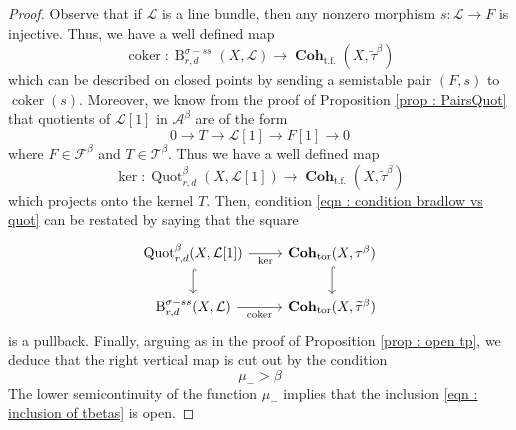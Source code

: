 \documentclass[10pt,a4paper]{amsart}
\newcommand{\Quotbetaonerd}{\operatorname{Quot}_{r,d}^{\beta}(X,\mathcal{L}[1])}
\newcommand{\abeta}{\mathcal{A}^{\beta}}
\newcommand{\bradlb}{\operatorname{{B}}^{\sigma - ss}_{r,d}(X,\mathcal{L})}
\newcommand{\cohflat}{\boldsymbol{\operatorname{Coh}}}
\newcommand{\fbeta}{\mathcal{F}^{\beta}}
\newcommand{\linebundle}{\mathcal{L}}
\newcommand{\tbeta}{\mathcal{T}^{\beta}}
\begin{document}
\begin{proof}
    \noindent Observe that if $\linebundle$ is a line bundle, then any nonzero morphism $s \colon \linebundle \rightarrow F$ is injective. Thus, we have a well defined map
    \begin{equation}\label{eqn : coker map for bradlow pairs}
        \operatorname{coker} \colon \bradlb \longrightarrow \cohflat_{\operatorname{t.f.}}(X,\widetilde{\tau}^{\beta})
    \end{equation}
     which can be described on closed points by sending a semistable pair $(F,s)$ to $\operatorname{coker}(s)$. Moreover, we know from the proof of Proposition \eqref{prop : PairsQuot} that quotients of $\linebundle[1]$ in $\abeta$ are of the form
    \[
        0\rightarrow T \rightarrow \linebundle [1] \rightarrow F[1] \rightarrow 0
    \]
    where $F \in \fbeta$ and $T\in \tbeta$. Thus we have a well defined map
      \begin{equation}\label{eqn : ker map for quot}
        \operatorname{ker} \colon \Quotbetaonerd \longrightarrow \cohflat_{\operatorname{t.f.}}(X,\widetilde{\tau}^{\beta})
    \end{equation}
    which projects onto the kernel $T$. Then, condition \eqref{eqn : condition bradlow vs quot} can be restated by saying that the square
\[\begin{tikzcd}
	\Quotbetaonerd & {\cohflat_{\operatorname{tor}}(X,{\tau}^{\beta})} \\
	\bradlb & {\cohflat_{\operatorname{tor}}(X,\widetilde{\tau}^{\beta})}
	\arrow["{\operatorname{ker}}"',from=1-1, to=1-2]
	\arrow[hook, from=1-1, to=2-1]
	\arrow[hook, from=1-2, to=2-2]
	\arrow["{\operatorname{coker}}"', from=2-1, to=2-2]
\end{tikzcd}\]
is a pullback. Finally, arguing as in the proof of Proposition \ref{prop : open tp}, we deduce that the right vertical map is cut out by the condition 
    \[
        \mu_- > \beta
    \]
    The lower semicontinuity of the function $\mu_-$ implies that the inclusion \eqref{eqn : inclusion of tbetas} is open. 
\end{proof}
\end{document}

